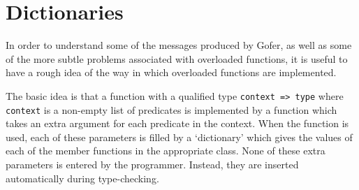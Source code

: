 \section{Dictionaries}
In order to understand some of the messages produced by Gofer, as  well
as  some  of  the  more  subtle  problems  associated  with  overloaded
functions, it is useful to have a  rough  idea  of  the  way  in  which
overloaded functions are implemented.

The basic idea is that a function with a qualified type \verb"context => type"
where \verb"context" is a non-empty list of predicates  is  implemented  by  a
function which takes an  extra  argument  for  each  predicate  in  the
context.  When the function is used, each of these parameters is filled
by a `dictionary'  which  gives  the  values  of  each  of  the  member
functions in the appropriate class.  None of these extra parameters  is
entered by the programmer.  Instead, they  are  inserted  automatically
during type-checking.

